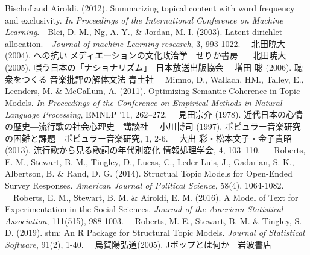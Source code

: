 \documentclass[
]{article}
\begin{document}
Bischof and Airoldi. (2012). Summarizing topical content with word
frequency and exclusivity. \emph{In Proceedings of the International
Conference on Machine Learning}.　\newline Blei, D. M., Ng, A. Y., \&
Jordan, M. I. (2003). Latent dirichlet allocation.　\emph{Journal of
machine Learning research}, 3, 993-1022. 　\newline 北田暁大 (2004).
への抗い メディエーションの文化政治学　せりか書房 　\newline
北田暁大(2005). 嗤う日本の「ナショナリズム」　日本放送出版協会
　\newline 増田 聡 (2006). 聴衆をつくる 音楽批評の解体文法 青土社
　\newline Mimno, D., Wallach, HM., Talley, E., Leenders, M. \&
McCallum, A. (2011). Optimizing Semantic Coherence in Topic Models.
\emph{In Proceedings of the Conference on Empirical Methods in Natural
Language Processing}, EMNLP '11, 262--272. 　\newline 見田宗介 (1978).
近代日本の心情の歴史―流行歌の社会心理史　講談社 　\newline 小川博司
(1997). ポピュラー音楽研究の困難と課題　ポピュラー音楽研究, 1, 2-6.
　\newline 大出 彩・松本文子・金子貴昭 (2013).
流行歌から見る歌詞の年代別変化 情報処理学会, 4, 103‒110. 　\newline
Roberts, E. M., Stewart, B. M., Tingley, D., Lucas, C., Leder-Luis, J.,
Gadarian, S. K., Albertson, B. \& Rand, D. G. (2014). Structual Topic
Models for Open-Ended Survey Responses. \emph{American Journal of
Political Science}, 58(4), 1064-1082. 　\newline Roberts, E. M.,
Stewart, B. M. \& Airoldi, E. M. (2016). A Model of Text for
Experimentation in the Social Sciences. \emph{Journal of the American
Statistical Association}, 111(515), 988-1003. 　\newline Roberts, M. E.,
Stewart, B. M. \& Tingley, S. D. (2019). stm: An R Package for
Structural Topic Models. \emph{Journal of Statistical Software}, 91(2),
1-40. 　\newline 烏賀陽弘道(2005). Jポップとは何か　岩波書店 　\newline
\end{document}

